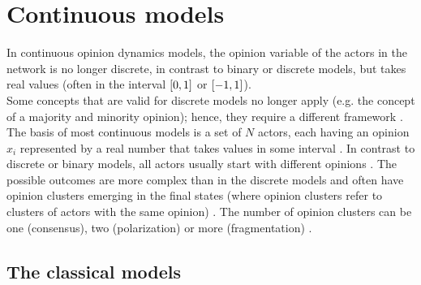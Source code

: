 \documentclass[11 pt , letterpaper , twoside , openright]{book}
\begin{document}
\section{Continuous models}\label{Con}

In continuous opinion dynamics models, the opinion variable of the actors in the network is no longer discrete, in contrast to binary or discrete models, but takes real values (often in the interval $\interval{0}{1}$ or $\interval{-1}{1}$).\\
\newline
Some concepts that are valid for discrete models no longer apply (e.g. the concept of a majority and minority opinion); hence, they require a different framework \cite{Castellano2009}. \\
\newline
The basis of most continuous models is a set of $N$ actors, each having an opinion $x_i$ represented by a real number that takes values in some interval \cite{Castellano2009}. In contrast to discrete or binary models, all actors usually start with different opinions \cite{Castellano2009}. The possible outcomes are more complex than in the discrete models and often have opinion clusters emerging in the final states (where opinion clusters refer to clusters of actors with the same opinion) \cite{Castellano2009}. The number of opinion clusters can be one (consensus), two (polarization) or more (fragmentation) \cite{Castellano2009}.

\subsection{The classical models}\label{classMod}
\end{document}
